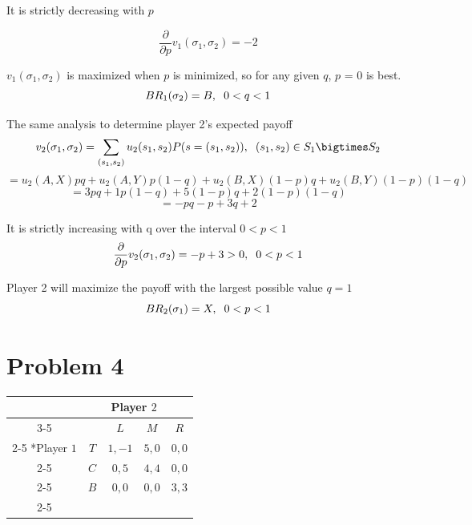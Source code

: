 \documentclass[a4paper,11pt]{article}
\begin{document}
It is strictly decreasing with $p$

\[ \frac{\partial}{\partial p} v_1(\sigma_1, \sigma_2) = -2 \]

$v_1(\sigma_1, \sigma_2)$ is maximized when $p$ is minimized, so for any given $q$, $p$ = 0 is best.
\[ BR_1(\sigma_2) = B,\hspace{2mm} 0 < q < 1 \]

\vspace{12px}

The same analysis to determine player 2's expected payoff
\[ v_2(\sigma_1, \sigma_2) = \sum_{(s_1, s_2)} u_2(s_1, s_2) P(s = (s_1, s_2)), \hspace{2mm} (s_1, s_2) \in S_1 \bigtimes S_2 \]
\[ = u_2(A,X)pq + u_2(A,Y)p(1 - q) + u_2(B,X)(1 - p)q + u_2(B,Y)(1 - p)(1 - q)\] 
\[ = 3pq + 1p(1 - q) + 5(1 - p)q + 2(1 - p)(1 - q) \] 
\[ =  -pq -p + 3q + 2 \]

It is strictly increasing with q over the interval $0 < p < 1$
\[ \frac{\partial}{\partial p} v_2(\sigma_1, \sigma_2) = -p + 3 > 0, \hspace{2mm} 0 < p < 1 \]

Player 2 will maximize the payoff with the largest possible value $q = 1$
\[ BR_2(\sigma_1) = X,\hspace{2mm} 0 < p < 1 \]


\section*{Problem 4}

\begin{table}[htbp]
  \setlength{\extrarowheight}{2pt}
  \begin{center}
  \begin{tabular}{*{5}{c|}}
    \multicolumn{2}{c}{} & \multicolumn{2}{c}{Player $2$}\\\cline{3-5}
    \multicolumn{1}{c}{}       &     &   $L$ &   $M$ & $R$ \\\cline{2-5}
    \multirow{2}*{Player $1$}  & $T$ & $1,-1$ & $5,0$ & $0,0$ \\\cline{2-5}
                               & $C$ & $0,5$  & $4,4$ & $0,0$ \\\cline{2-5}
                               & $B$ & $0,0$  & $0,0$ & $3,3$ \\\cline{2-5}
  \end{tabular}\\
  \end{center}
\end{table}
\end{document}
